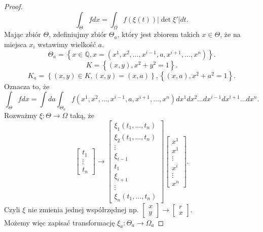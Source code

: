\documentclass[../main.tex]{subfiles}
\begin{document}
\begin{proof}
    \[
        \int_{\Theta} f dx = \int_{\Omega}f(\xi(t))|\det \xi'|dt
    .\]
    Mając zbiór $\Theta$, zdefiniujmy zbiór $\Theta_a$, który jest zbiorem takich $x\in\Theta$, że na miejsca $x_i$ wstawimy wielkość $a$.
    \[
        \Theta_a = \left\{ x\in \mathbb{Q}, x = \left( x^1,x^2,\ldots,x^{i-1},a,x^{i+1},\ldots,x^n \right)  \right\}
    .\]
    \[
        K = \left\{ (x,y), x^2+y^2 = 1 \right\}
    .\]
    \[
        K_a = \left\{ (x,y)\in K, (x,y) = (x,a) \right\}, \left\{ (x,a), x^2+a^2 = 1 \right\}
    .\]
    Oznacza to, że
    \[
        \int_\Theta f dx = \int da \int_{\Theta_a}f(x^1,x^2,\ldots,x^{i-1},a,x^{i+1},\ldots,x^n) dx^1 dx^2 \ldots dx^{i-1} dx^{i+1}\ldots dx^n
    .\]
    Rozważmy $\xi: \Theta \to \Omega$ taką, że
    \[
        \begin{bmatrix} t_1\\ \vdots \\ t_n \end{bmatrix} \to \begin{bmatrix} \xi_1(t_1,\ldots,t_n)\\ \xi_2(t_1,\ldots,t_n) \\ \vdots \\ \xi_{i-1} \\ t_1 \\ \xi_{i+1} \\ \vdots \\ \xi_n(t_1,\ldots,t_n)
    \end{bmatrix} \begin{bmatrix} x^1\\x^1\\ \vdots \\ x^i \\ \vdots \\ x^n \end{bmatrix}
    .\]
    Czyli $\xi$ nie zmienia jednej współrzędnej np.
    $\begin{bmatrix}
        x\\y
    \end{bmatrix}
    \to
    \begin{bmatrix}
        r\\x
    \end{bmatrix}$.\\
    Możemy więc zapisać transformację $\xi_a: \Theta_a\to\Omega_a$


\end{proof}
\end{document}
